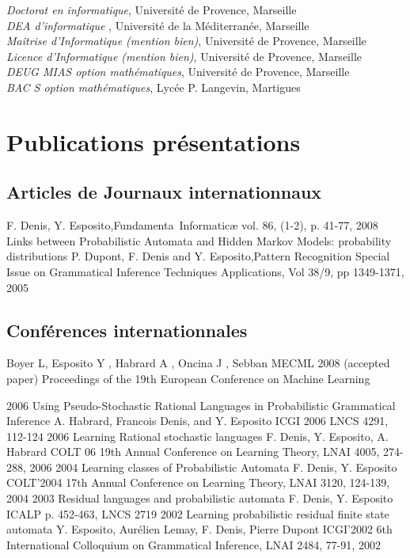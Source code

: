 \noindent{}\emph{Doctorat en informatique}, Université de Provence, Marseille\\
\noindent{}\emph{\textsc{DEA} d'informatique} , Université de la Méditerranée, Marseille\\
\noindent{}\emph{Maîtrise d'Informatique {\footnotesize(mention bien)}}, Université de Provence, Marseille\\
\noindent{}\emph{Licence d'Informatique {\footnotesize(mention bien)}}, Université de Provence, Marseille\\
\noindent{}\emph{\textsc{DEUG MIAS} {\footnotesize option mathématiques}}, Université de Provence, Marseille\\
\noindent{}\emph{\textsc{BAC S} {\footnotesize option mathématiques}}, Lycée P. Langevin, Martigues\\

\section*{Publications \amper{} présentations}

\subsection*{Articles de Journaux internationnaux}

{ F. Denis, Y. Esposito,}{Fundamenta~Informatic\ae{}}
{vol. 86, (1-2), p. 41-77, 2008}
{Links between Probabilistic Automata and Hidden Markov Models: probability distributions}
{ P. Dupont, F. Denis and Y. Esposito,}{Pattern Recognition}
{Special Issue on Grammatical Inference Techniques \amper{} Applications, Vol 38/9, pp 1349-1371, 2005}

\subsection*{Conférences internationnales}

{Boyer L, Esposito Y , Habrard A , Oncina J , Sebban M}{ECML 2008}
{(accepted paper) Proceedings of the 19th European Conference on Machine Learning }



\article
{2006} %
{Using Pseudo-Stochastic Rational Languages in Probabilistic Grammatical Inference} %
{A. Habrard, Francois Denis, and Y. Esposito} %
{ICGI 2006} %
{LNCS 4291, 112-124} %
\article
{2006}
{Learning Rational stochastic languages}
{F. Denis, Y. Esposito, A. Habrard}
{COLT 06}
{19th Annual Conference on Learning Theory, LNAI 4005, 274-288, 2006}
\article
{2004}
{Learning classes of Probabilistic Automata}
{F. Denis, Y. Esposito}
{COLT'2004}
{17th Annual Conference on Learning Theory, LNAI 3120, 124-139, 2004}
\article
{2003}
{Residual languages and probabilistic automata}
{F. Denis, Y. Esposito}
{ICALP}
{p. 452-463, LNCS 2719}
\article
{2002}
{Learning probabilistic residual finite state automata}
{Y. Esposito, Aurélien Lemay, F. Denis, Pierre Dupont}
{ICGI'2002}
{6th International Colloquium on Grammatical Inference,  LNAI 2484, 77-91, 2002}

